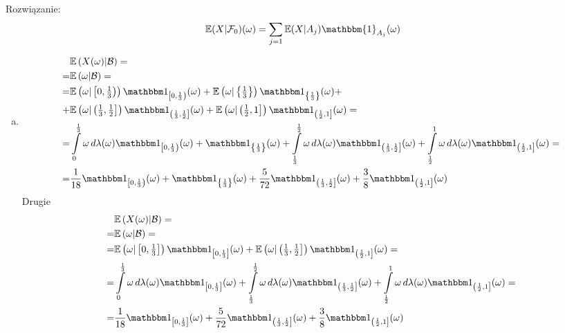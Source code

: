Rozwiązanie:
\begin{gather*}
\mathbb{E}(X|\mathcal F_0)(\omega)=\sum_{j=1}\mathbb{E}(X|A_j)\mathbbm{1}_{A_j}(\omega)
\end{gather*}
\begin{enumerate}[(a)]
\item 
\begin{align*}
&\mathbb E \left(X(\omega)|\mathcal B\right)
=\\=&
\mathbb E \left(\omega|\mathcal B\right)
=\\=&
\mathbb E \left(\omega|\left[0,\tfrac{1}{3}\right)\right)
\mathbbm1_{\left[0,\frac{1}{3}\right)}(\omega)
+
\mathbb E \left(\omega|\left\{\tfrac{1}{3}\right\}\right)
\mathbbm1_{\left\{\frac{1}{3}\right\}}(\omega)
+\\+&
\mathbb E \left(\omega|\left(\tfrac{1}{3},\tfrac{1}{2}\right]\right)
\mathbbm1_{\left(\frac{1}{3},\frac{1}{2}\right]}(\omega)
+
\mathbb E \left(\omega|\left(\tfrac{1}{2},1\right]\right)
\mathbbm1_{\left(\frac{1}{2},1\right]}(\omega)
=\\=&
\int\limits_{0}^{\frac{1}{3}}\omega\,d\lambda(\omega)
\mathbbm1_{\left[0,\frac{1}{3}\right)}(\omega)
+
\mathbbm1_{\left\{\frac{1}{3}\right\}}(\omega)
+
\int\limits_{\frac{1}{3}}^{\frac{1}{2}}\omega\,d\lambda(\omega)
\mathbbm1_{\left(\frac{1}{3},\frac{1}{2}\right]}(\omega)
+
\int\limits_{\frac{1}{2}}^{1}\omega\,d\lambda(\omega)
\mathbbm1_{\left(\frac{1}{2},1\right]}(\omega)
=\\=&
\frac{1}{18}
\mathbbm1_{\left[0,\frac{1}{3}\right)}(\omega)
+
\mathbbm1_{\left\{\frac{1}{3}\right\}}(\omega)
+
\frac{5}{72}
\mathbbm1_{\left(\frac{1}{3},\frac{1}{2}\right]}(\omega)
+
\frac{3}{8}
\mathbbm1_{\left(\frac{1}{2},1\right]}(\omega)
\end{align*}
Drugie
\begin{align*}
&\mathbb E \left(X(\omega)|\mathcal B\right)
=\\=&
\mathbb E \left(\omega|\mathcal B\right)
=\\=&
\mathbb E \left(\omega|\left[0,\tfrac{1}{3}\right]\right)
\mathbbm1_{\left[0,\frac{1}{3}\right]}(\omega)
+
\mathbb E \left(\omega|\left(\tfrac{1}{3},\tfrac{1}{2}\right]\right)
\mathbbm1_{\left(\frac{1}{2},1\right]}(\omega)
=\\=&
\int\limits_{0}^{\frac{1}{3}}\omega\,d\lambda(\omega)
\mathbbm1_{\left[0,\frac{1}{3}\right]}(\omega)
+
\int\limits_{\frac{1}{3}}^{\frac{1}{2}}\omega\,d\lambda(\omega)
\mathbbm1_{\left(\frac{1}{3},\frac{1}{2}\right]}(\omega)
+
\int\limits_{\frac{1}{2}}^{1}\omega\,d\lambda(\omega)
\mathbbm1_{\left(\frac{1}{2},1\right]}(\omega)
=\\=&
\frac{1}{18}
\mathbbm1_{\left[0,\frac{1}{3}\right]}(\omega)
+
\frac{5}{72}
\mathbbm1_{\left(\frac{1}{3},\frac{1}{2}\right]}(\omega)
+
\frac{3}{8}
\mathbbm1_{\left(\frac{1}{2},1\right]}(\omega)
\end{align*}
\end{enumerate}


